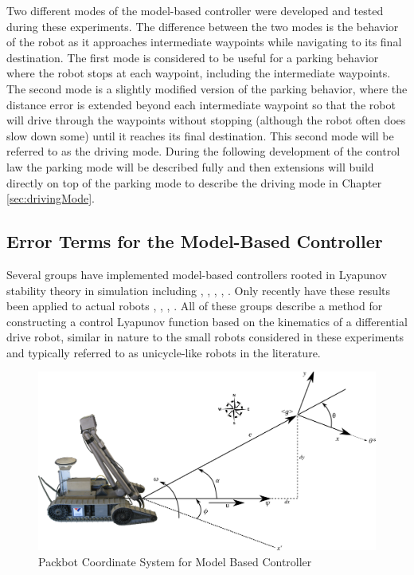 Two different modes of the model-based controller were developed and tested during these experiments. The difference between the two modes is the behavior of the robot as it approaches intermediate waypoints while navigating to its final destination. The first mode is considered to be useful for a parking behavior where the robot stops at each waypoint, including the intermediate waypoints. The second mode is a slightly modified version of the parking behavior, where the distance error is extended beyond each intermediate waypoint so that the robot will drive through the waypoints without stopping (although the robot often does slow down some) until it reaches its final destination. This second mode will be referred to as the driving mode. During the following development of the control law the parking mode will be described fully and then extensions will build directly on top of the parking mode to describe the driving mode in Chapter \ref{sec:drivingMode}.

\subsection{Error Terms for the Model-Based Controller}
\label{sec:errorTermsMBC}
Several groups have implemented model-based controllers rooted in Lyapunov stability theory in simulation including \cite{MicaelliLyapunov93}, \cite{Aicardi94}, \cite{Aicardi_UnicycleLyapunov95}, \cite{Rusu05RobotuxLyapunov}, \cite{Gulati08}. Only recently have these results been applied to actual robots \cite{KimLyapunov05}, \cite{Lapierre06}, \cite{Lapierre07}, \cite{NuchterLyapunov07}. All of these groups describe a method for constructing a control Lyapunov function based on the kinematics of a differential drive robot, similar in nature to the small robots considered in these experiments and typically referred to as unicycle-like robots in the literature.

\begin{figure}[ht!]
	\centering
	\includegraphics[width=.95\textwidth]{images/packbotlyapunov}
	\caption{Packbot Coordinate System for Model Based Controller}
	\label{fig:pblyapunov}
\end{figure}

